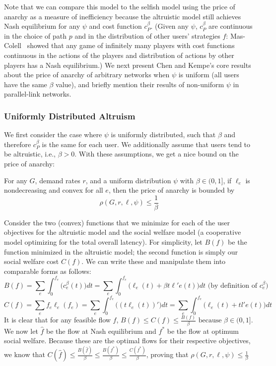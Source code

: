 Note that we can compare this model to the selfish model using the price of anarchy as a measure of inefficiency
because the altruistic model still achieves Nash equilibrium for any $\psi$ and cost function $c^\beta_P$. (Given any $\psi$, $c^\beta_P$ are continuous in the choice of path $p$ and in the distribution of other users' strategies $f$: Mas-Colell~\cite{mascolell} showed that any game of infinitely many players with cost functions continuous in the actions of the players and distribution of actions by other players has a Nash equilibrium.)
We next present Chen and Kempe's core results about the price of anarchy of arbitrary networks when $\psi$ is uniform (all users have the same $\beta$ value), and briefly mention their results of non-uniform $\psi$ in parallel-link networks.

\subsubsection{Uniformly Distributed Altruism}
We first consider the case where $\psi$ is uniformly distributed, such that $\beta$ and therefore $c^\beta_P$ is the same for each user. We additionally assume that users tend to be altruistic, i.e., $\beta > 0$.
With these assumptions, we get a nice bound on the price of anarchy:
\begin{theorem}
For any $G$, demand rates $r$, and 
a uniform distribution $\psi$ with $\beta \in (0, 1]$,
if $\ell_e$ is nondecreasing and convex for all $e$, then the price of anarchy is bounded by 
    $$\rho(G,r,\ell,\psi) \le \frac{1}{\beta}$$
\end{theorem}

\begin{proof-sketch}
    Consider the two (convex) functions that we minimize for each of the user objectives
    for the altruistic model and the social welfare model (a cooperative model optimizing for the total overall latency).
    For simplicity, let $B(f)$ be the function minimized in the altruistic model; the second function is simply our social welfare cost $C(f)$.
    We can write these and manipulate them into comparable forms as follows:
    $$B(f) = \sum_e\int_0^{{f}_e}\Big(c_e^\beta(t)\Big)dt = 
        \sum_e\int_0^{{f}_e} \Big(\ell_e(t) + \beta t\ell'e(t)\Big)dt\text{ (by definition of $c^\beta_e$)}$$
    $$C(f) = \sum_ef_e\ell_e(f_e) = \sum_e\int_0^{f_e} \Big((t\ell_e(t))' \Big)dt 
        = \sum_e\int_0^{f_e} \Big(\ell_e(t) + tl'e(t)\Big)dt$$ 
    It is clear that for any feasible flow $f$, 
    $B(f) \le C(f) \le \frac{B(f)}{\beta} \text{ because $\beta\in(0,1]$}$.
    We now let $\hat{f}$ be the flow at Nash equilibrium and $f^*$ be the flow at optimum social welfare. Because these are the optimal flows for their respective objectives, we know that 
    $C(\hat{f}) \le \frac{B(\hat{f})}{\beta} \le \frac{B(f^*)}{\beta} \le \frac{C(f^*)}{\beta}$,
    proving that 
    $\rho(G,r,\ell,\psi) \le \frac{1}{\beta}$
\end{proof-sketch}

